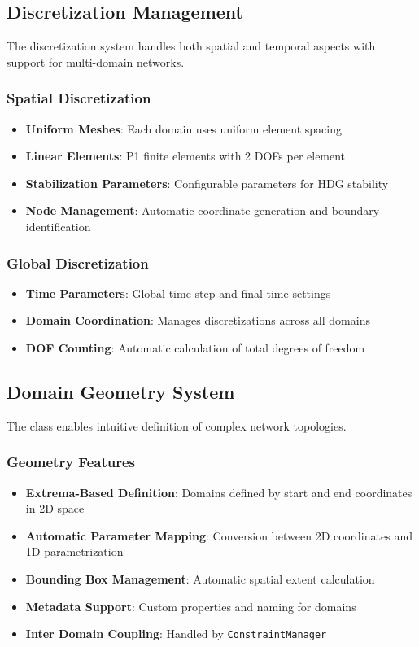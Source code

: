\subsection{Discretization Management}

The discretization system handles both spatial and temporal aspects with support for multi-domain networks.

\subsubsection{Spatial Discretization}
\begin{itemize}
    \item \textbf{Uniform Meshes}: Each domain uses uniform element spacing
    \item \textbf{Linear Elements}: P1 finite elements with 2 DOFs per element
    \item \textbf{Stabilization Parameters}: Configurable  parameters for HDG stability
    \item \textbf{Node Management}: Automatic coordinate generation and boundary identification
\end{itemize}

\subsubsection{Global Discretization}
\begin{itemize}
    \item \textbf{Time Parameters}: Global time step and final time settings
    \item \textbf{Domain Coordination}: Manages discretizations across all domains
    \item \textbf{DOF Counting}: Automatic calculation of total degrees of freedom
\end{itemize}

\subsection{Domain Geometry System}

The  class enables intuitive definition of complex network topologies.

\subsubsection{Geometry Features}
\begin{itemize}
    \item \textbf{Extrema-Based Definition}: Domains defined by start and end coordinates in 2D space
    \item \textbf{Automatic Parameter Mapping}: Conversion between 2D coordinates and 1D parametrization
    \item \textbf{Bounding Box Management}: Automatic spatial extent calculation
    \item \textbf{Metadata Support}: Custom properties and naming for domains
    \item \textbf{Inter Domain Coupling}: Handled by {\tt ConstraintManager}
\end{itemize}

